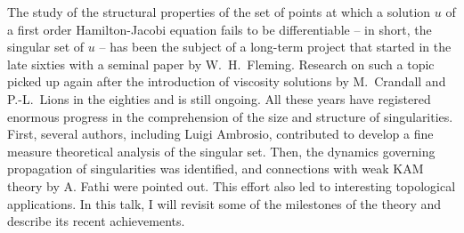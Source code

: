 \mypage
{}
\begin{myabstract}
The study of the structural properties of the set of points 
at which a solution $u$ of a first order Hamilton-Jacobi 
equation fails to be differentiable 
-- in short, the singular set of $u$ -- 
has been the subject of a long-term project 
that started in the late sixties with a seminal paper by 
W.~H.~Fleming. 
Research on such a topic picked up again after the 
introduction of viscosity solutions by M.~Crandall and 
P.-L.~Lions in the eighties and is still ongoing. 
All these years have registered enormous progress in the 
comprehension of the size and structure of singularities. 
First, several authors, including Luigi Ambrosio, 
contributed to develop a fine measure theoretical 
analysis of the singular set. Then, the dynamics 
governing propagation of singularities was identified, 
and connections with weak KAM theory by 
A. Fathi were pointed out. This effort also led to 
interesting topological applications. In this talk, 
I will revisit some of the milestones of the theory 
and describe its recent achievements.
\end{myabstract}
